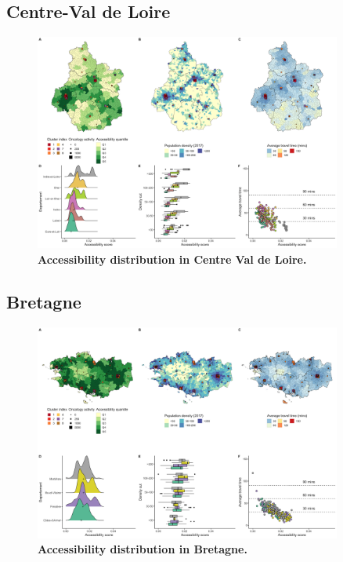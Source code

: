 \subsection*{Centre-Val de Loire}

\begin{figure}[H]
    \includegraphics[width=0.9\textwidth]{images/camion/region_accessibility/accessibility_Centre-Val-de-Loire.png}
    \centering
    \caption{
        \textbf{Accessibility distribution in Centre Val de Loire.}
    }
\end{figure}

\subsection*{Bretagne}

\begin{figure}[H]
    \includegraphics[width=0.9\textwidth]{images/camion/region_accessibility/accessibility_Bretagne.png}
    \centering
    \caption{
        \textbf{Accessibility distribution in Bretagne.}
    }
\end{figure}

